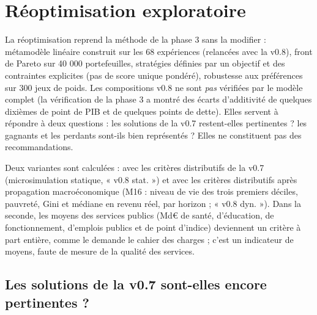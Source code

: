 \chapter{Réoptimisation exploratoire}\label{ch:optimisation}

\begin{hypothese}
La réoptimisation reprend la méthode de la phase 3 sans la modifier : métamodèle linéaire construit sur les 68
expériences (relancées avec la v0.8), front de Pareto sur 40 000 portefeuilles, stratégies définies par un objectif et
des contraintes explicites (pas de score unique pondéré), robustesse aux préférences sur 300 jeux de poids. Les
compositions v0.8 ne sont \emph{pas} vérifiées par le modèle complet (la vérification de la phase 3 a montré des écarts
d'additivité de quelques dixièmes de point de PIB et de quelques points de dette). Elles servent à répondre à deux
questions : les solutions de la v0.7 restent-elles pertinentes ? les gagnants et les perdants sont-ils bien représentés ?
Elles ne constituent pas des recommandations.
\end{hypothese}

Deux variantes sont calculées : avec les critères distributifs de la v0.7 (microsimulation statique, « v0.8 stat. ») et
avec les critères distributifs après propagation macroéconomique (M16 : niveau de vie des trois premiers déciles,
pauvreté, Gini et médiane en revenu réel, par horizon ; « v0.8 dyn. »). Dans la seconde, les moyens des services
publics (Md€ de santé, d'éducation, de fonctionnement, d'emplois publics et de point d'indice) deviennent un critère à
part entière, comme le demande le cahier des charges ; c'est un indicateur de moyens, faute de mesure de la qualité des
services.

\section{Les solutions de la v0.7 sont-elles encore pertinentes ?}

\begin{table}[htbp]\centering\scriptsize
\caption{Composition des stratégies v0.7 et v0.8 réoptimisées (écart à la législation actuelle). 07 : v0.7 ;
08s : v0.8, distribution statique ; 08d : v0.8, distribution après propagation.}\label{tab:optim_compo}
\end{table}

